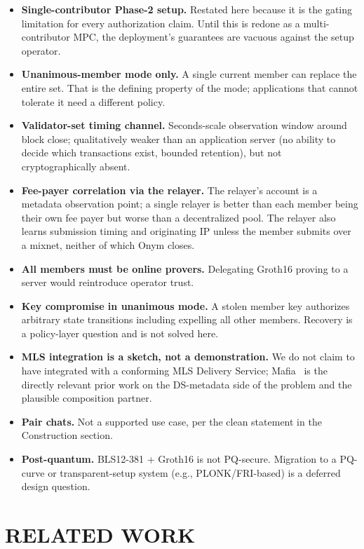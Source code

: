 \documentclass{IEEEcsmag}
\begin{document}
\begin{itemize}
\item \textbf{Single-contributor Phase-2 setup.} Restated here because it is the gating limitation for every authorization claim. Until this is redone as a multi-contributor MPC, the deployment's guarantees are vacuous against the setup operator.
\item \textbf{Unanimous-member mode only.} A single current member can replace the entire set. That is the defining property of the mode; applications that cannot tolerate it need a different policy.
\item \textbf{Validator-set timing channel.} Seconds-scale observation window around block close; qualitatively weaker than an application server (no ability to decide which transactions exist, bounded retention), but not cryptographically absent.
\item \textbf{Fee-payer correlation via the relayer.} The relayer's account is a metadata observation point; a single relayer is better than each member being their own fee payer but worse than a decentralized pool. The relayer also learns submission timing and originating IP unless the member submits over a mixnet, neither of which Onym closes.
\item \textbf{All members must be online provers.} Delegating Groth16 proving to a server would reintroduce operator trust.
\item \textbf{Key compromise in unanimous mode.} A stolen member key authorizes arbitrary state transitions including expelling all other members. Recovery is a policy-layer question and is not solved here.
\item \textbf{MLS integration is a sketch, not a demonstration.} We do not claim to have integrated with a conforming MLS Delivery Service; Mafia~\cite{mafia2025} is the directly relevant prior work on the DS-metadata side of the problem and the plausible composition partner.
\item \textbf{Pair chats.} Not a supported use case, per the clean statement in the Construction section.
\item \textbf{Post-quantum.} BLS12-381 + Groth16 is not PQ-secure. Migration to a PQ-curve or transparent-setup system (e.g., PLONK/FRI-based) is a deferred design question.
\end{itemize}


\section{RELATED WORK}
\end{document}
